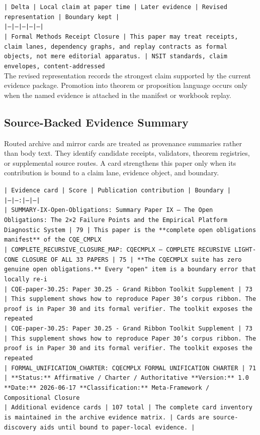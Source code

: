 \documentclass[11pt]{article}
\begin{document}
\noindent\texttt{| Delta | Local claim at paper time | Later evidence | Revised representation | Boundary kept |}\\
\noindent\texttt{|---|---|---|---|---|}\\
\noindent\texttt{| Formal Methods Receipt Closure | This paper may treat receipts, claim lanes, dependency graphs, and replay contracts as formal objects, not mere editorial apparatus. | NSIT standards, claim envelopes, content-addressed}\\

The revised representation records the strongest claim supported by the current evidence package. Promotion into theorem or proposition language occurs only when the named evidence is attached in the manifest or workbook replay.

\subsection*{Source-Backed Evidence Summary}

Routed archive and mirror cards are treated as provenance summaries rather than
body text. They identify candidate receipts, validators, theorem registries, or
supplemental source routes. A card strengthens this paper only when its
contribution is bound to a claim lane, evidence object, and boundary.

\noindent\texttt{| Evidence card | Score | Publication contribution | Boundary |}\\
\noindent\texttt{|---|---:|---|---|}\\
\noindent\texttt{| SUMMARY-IX-Open-Obligations: Summary Paper IX — The Open Obligations: The 2×2 Failure Points and the Empirical Platform Diagnostic System | 79 | This paper is the **complete open obligations manifest** of the CQE\_CMPLX}\\
\noindent\texttt{| COMPLETE\_RECURSIVE\_CLOSURE\_MAP: CQECMPLX — COMPLETE RECURSIVE LIGHT-CONE CLOSURE OF ALL 33 PAPERS | 75 | **The CQECMPLX suite has zero genuine open obligations.** Every "open" item is a boundary error that locally re-i}\\
\noindent\texttt{| CQE-paper-30.25: Paper 30.25 - Grand Ribbon Toolkit Supplement | 73 | This supplement shows how to reproduce Paper 30's corpus ribbon. The proof is in Paper 30 and its formal verifier. The toolkit exposes the repeated }\\
\noindent\texttt{| CQE-paper-30.25: Paper 30.25 - Grand Ribbon Toolkit Supplement | 73 | This supplement shows how to reproduce Paper 30's corpus ribbon. The proof is in Paper 30 and its formal verifier. The toolkit exposes the repeated }\\
\noindent\texttt{| FORMAL\_UNIFICATION\_CHARTER: CQECMPLX FORMAL UNIFICATION CHARTER | 71 | **Status:** Affirmative / Charter / Authoritative **Version:** 1.0 **Date:** 2026-06-17 **Classification:** Meta-Framework / Compositional Closure }\\
\noindent\texttt{| Additional evidence cards | 107 total | The complete card inventory is maintained in the archive evidence matrix. | Cards are source-discovery aids until bound to paper-local evidence. |}\\
\end{document}
